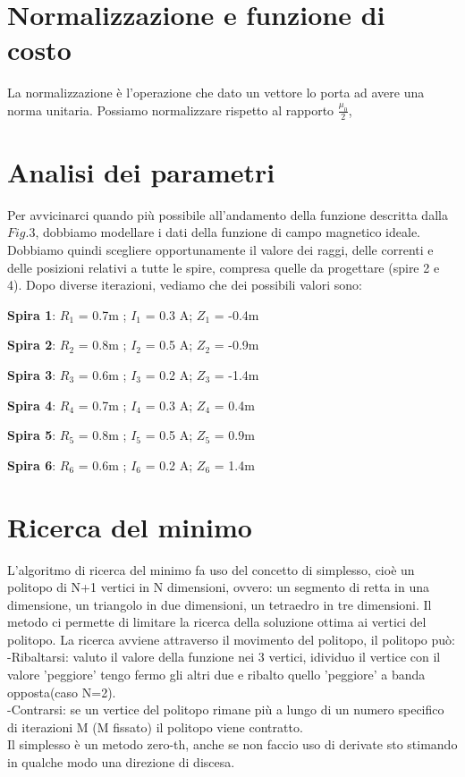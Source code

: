 \documentclass[a4paper, 11pt]{article}
\begin{document}
\section*{Normalizzazione e funzione di costo}

La normalizzazione è l'operazione che dato un vettore lo porta ad avere una
norma unitaria. Possiamo normalizzare rispetto al rapporto $\frac{\mu_{0}}{2}$,

\section*{Analisi dei parametri}

Per avvicinarci quando più possibile all'andamento della funzione descritta
dalla $Fig.3$, dobbiamo modellare i dati della funzione di campo magnetico ideale.
Dobbiamo quindi scegliere opportunamente il valore dei raggi, delle correnti e
delle posizioni relativi a tutte le spire, compresa quelle da progettare (spire
2 e 4). 
Dopo diverse iterazioni, vediamo che dei possibili valori sono:
\newline  \\
\centerline{ \textbf{Spira 1}: $R_{1}$ = 0.7m ; $I_{1}$ = 0.3 A; $Z_{1}$ = -0.4m} 
\centerline{ \textbf{Spira 2}: $R_{2}$ = 0.8m ; $I_{2}$ = 0.5 A; $Z_{2}$ = -0.9m}
\centerline{ \textbf{Spira 3}: $R_{3}$ = 0.6m ; $I_{3}$ = 0.2 A; $Z_{3}$ = -1.4m}
\centerline{ \textbf{Spira 4}: $R_{4}$ = 0.7m ; $I_{4}$ = 0.3 A; $Z_{4}$ = 0.4m}
\centerline{ \textbf{Spira 5}: $R_{5}$ = 0.8m ; $I_{5}$ = 0.5 A; $Z_{5}$ = 0.9m}
\centerline{ \textbf{Spira 6}: $R_{6}$ = 0.6m ; $I_{6}$ = 0.2 A; $Z_{6}$ = 1.4m}

\section* {Ricerca del minimo}

L'algoritmo di ricerca del minimo fa uso del concetto di simplesso, cioè un politopo di N+1 vertici 
in N dimensioni, ovvero: un segmento di retta in una dimensione, un triangolo in due 
dimensioni, un tetraedro in tre dimensioni. Il metodo ci permette di limitare la
ricerca della soluzione ottima ai vertici del politopo. La ricerca avviene 
attraverso il movimento del politopo, il politopo può:\\   
-Ribaltarsi:    valuto il valore della funzione nei 3 vertici, idividuo il vertice
	con il valore 'peggiore' tengo fermo gli altri due e ribalto quello 
	'peggiore' a banda opposta(caso N=2). \\
-Contrarsi:     se un vertice del politopo rimane più a lungo di un numero 
	specifico di iterazioni M (M fissato) il politopo viene contratto.\\
Il simplesso è un metodo zero-th, anche se non faccio uso di derivate sto stimando in qualche
modo una direzione di discesa. 



\begin{thebibliography}{9}
\end{thebibliography}
\end{document}
